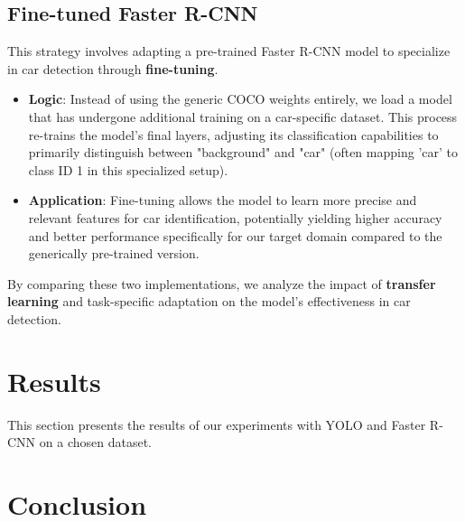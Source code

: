 \documentclass[12pt,a4paper]{article}
\begin{document}
\subsection{Fine-tuned Faster R-CNN}
This strategy involves adapting a pre-trained Faster R-CNN model to specialize in car detection through \textbf{fine-tuning}.

\begin{itemize}
    \item \textbf{Logic}: Instead of using the generic COCO weights entirely, we load a model that has undergone additional training on a car-specific dataset. This process re-trains the model's final layers, adjusting its classification capabilities to primarily distinguish between "background" and "car" (often mapping 'car' to class ID 1 in this specialized setup).
    \item \textbf{Application}: Fine-tuning allows the model to learn more precise and relevant features for car identification, potentially yielding higher accuracy and better performance specifically for our target domain compared to the generically pre-trained version.
\end{itemize}

By comparing these two implementations, we analyze the impact of \textbf{transfer learning} and task-specific adaptation on the model's effectiveness in car detection.

\section{Results}
\label{sec:results}
This section presents the results of our experiments with YOLO and Faster R-CNN on a chosen dataset. 

\section{Conclusion}
\label{sec:conclusion}


 


\label{sec:literature}
\end{document}
